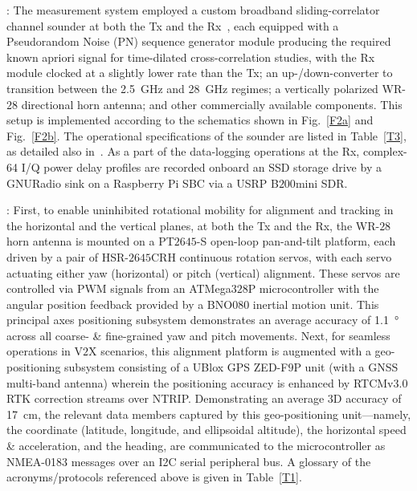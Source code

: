 \documentclass[10pt, twocolumn]{IEEEtran}
\begin{document}
: The measurement system employed a custom broadband sliding-correlator channel sounder at both the Tx and the Rx~\cite{Purdue}, each equipped with a Pseudorandom Noise (PN) sequence generator module producing the required known apriori signal for time-dilated cross-correlation studies, with the Rx module clocked at a slightly lower rate than the Tx; an up-/down-converter to transition between the \SI{2.5}{\giga\hertz} and \SI{28}{\giga\hertz} regimes; a vertically polarized WR-$28$ directional horn antenna; and other commercially available components. This setup is implemented according to the schematics shown in Fig.~\ref{F2a} and Fig.~\ref{F2b}. The operational specifications of the sounder are listed in Table~\ref{T3}, as detailed also in~\cite{Purdue}. As a part of the data-logging operations at the Rx, complex-\SI{64}{} I/Q power delay profiles are recorded onboard an SSD storage drive by a GNURadio sink on a Raspberry Pi SBC via a USRP B$200$mini SDR.

: First, to enable uninhibited rotational mobility for alignment and tracking in the horizontal and the vertical planes, at both the Tx and the Rx, the WR-$28$ horn antenna is mounted on a PT$2645$-S open-loop pan-and-tilt platform, each driven by a pair of HSR-$2645$CRH continuous rotation servos, with each servo actuating either yaw (horizontal) or pitch (vertical) alignment. These servos are controlled via PWM signals from an ATMega$328$P microcontroller with the angular position feedback provided by a BNO$080$ inertial motion unit. This principal axes positioning subsystem demonstrates an average accuracy of \SI{1.1}{\degree} across all coarse- \& fine-grained yaw and pitch movements. Next, for seamless operations in V$2$X scenarios, this alignment platform is augmented with a geo-positioning subsystem consisting of a UBlox GPS ZED-F$9$P unit (with a GNSS multi-band antenna) wherein the positioning accuracy is enhanced by RTCMv$3.0$ RTK correction streams over NTRIP. Demonstrating an average $3$D accuracy of \SI{17}{\centi\meter}, the relevant data members captured by this geo-positioning unit---namely, the coordinate (latitude, longitude, and ellipsoidal altitude), the horizontal speed \& acceleration, and the heading, are communicated to the microcontroller as NMEA-0183 messages over an I2C serial peripheral bus. A glossary of the acronyms/protocols referenced above is given in Table~\ref{T1}.
\end{document}
